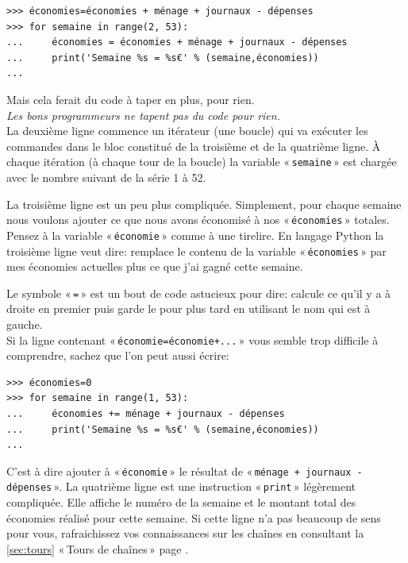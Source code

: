 \begin{Verbatim}[frame=single,rulecolor=\color{gray}, label=moche]
>>> économies=économies + ménage + journaux - dépenses
>>> for semaine in range(2, 53):
...     économies = économies + ménage + journaux - dépenses
...     print('Semaine %s = %s€' % (semaine,économies))
... 
\end{Verbatim}

Mais cela ferait du code à taper en plus, pour rien.\\

\emph{Les bons programmeurs ne tapent pas du code pour rien.}\\



La deuxième ligne commence un itérateur (une boucle) qui va exécuter les commandes dans le bloc constitué de la troisième et de la quatrième ligne. À chaque itération (à chaque tour de la boucle) la variable « \texttt{semaine} » est chargée avec le nombre suivant de la série 1 à 52.

La troisième ligne est un peu plus compliquée. Simplement, pour chaque semaine nous voulons ajouter ce que nous avons économisé à nos « \texttt{économies} » totales. Pensez à la variable « \texttt{économie} » comme à une tirelire. En langage Python la troisième ligne veut dire: remplace le contenu de la variable « \texttt{économies} » par mes économies actuelles plus ce que j'ai gagné cette semaine.

Le symbole « \texttt{=} » est un bout de code astucieux pour dire: calcule ce qu'il y a à droite en premier puis garde le pour plus tard en utilisant le nom qui est à gauche.\\

Si la ligne contenant « \texttt{économie=économie+...} » vous semble trop difficile à comprendre, sachez que l'on peut aussi écrire:

\begin{Verbatim}[frame=single,rulecolor=\color{mbleu}, label=à taper]
>>> économies=0
>>> for semaine in range(1, 53):
...     économies += ménage + journaux - dépenses
...     print('Semaine %s = %s€' % (semaine,économies))
... 
\end{Verbatim}

C'est à dire ajouter à « \texttt{économie} » le résultat de « \texttt{ménage + journaux - dépenses} ». La quatrième ligne est une instruction « \texttt{print} » légèrement compliquée. Elle affiche le numéro de la semaine et le montant total des économies réalisé pour cette semaine. Si cette ligne n'a pas beaucoup de sens pour vous, rafraichissez vos connaissances sur les chaînes en consultant la \autoref{sec:tours} « Tours de chaînes »  page \pageref{sec:tours}.


